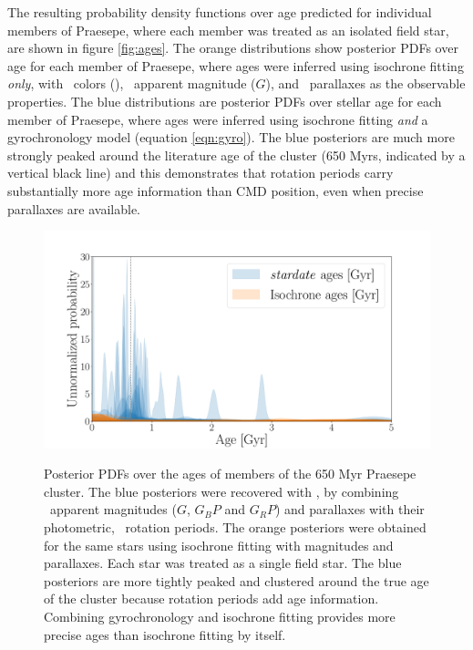 The resulting probability density functions over age predicted for individual
members of Praesepe, where each member was treated as an isolated field star,
are shown in figure \ref{fig:ages}.
The orange distributions show posterior PDFs over age for each member of
Praesepe, where ages were inferred using isochrone fitting {\it only},
with \gaia\ colors (\gcolor), \gaia\ apparent magnitude ($G$), and \gaia\
parallaxes as the observable properties.
The blue distributions are posterior PDFs over stellar age for each member of
Praesepe, where ages were inferred using isochrone fitting {\it and}
a gyrochronology model (equation \ref{eqn:gyro}).
The blue posteriors are much more strongly peaked around the literature age of
the cluster (650 Myrs, indicated by a vertical black line) and this
demonstrates that rotation periods carry substantially more age information
than CMD position, even when precise parallaxes are available.
\begin{figure}
  \caption{
Posterior PDFs over the ages of members of the 650 Myr Praesepe cluster.
The blue posteriors were recovered with \sd, by combining \gaia\ apparent
    magnitudes ($G$, $G_BP$ and $G_RP$) and parallaxes with their photometric,
    \ktwo\ rotation periods.
The orange posteriors were obtained for the same stars using isochrone fitting
    with \gaia magnitudes and parallaxes.
Each star was treated as a single field star.
The blue posteriors are more tightly peaked and clustered around the true age
of the cluster because rotation periods add age information.
Combining gyrochronology and isochrone fitting provides more precise ages than
    isochrone fitting by itself.
}
  \centering
    \includegraphics[width=1\textwidth]{praesepe_results}
\label{fig:praesepe}
\end{figure}

